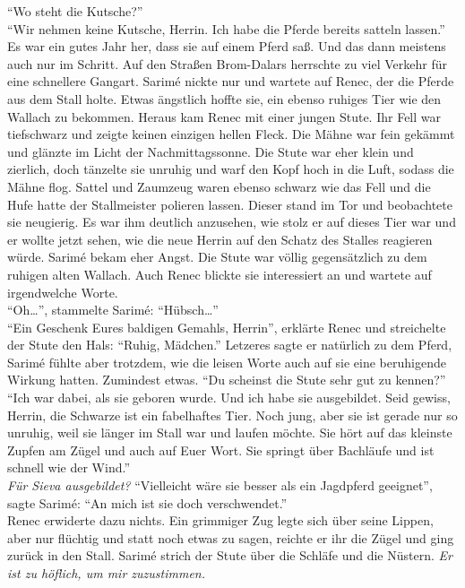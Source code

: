  ``Wo steht die Kutsche?''\\
``Wir nehmen keine Kutsche, Herrin. Ich habe die Pferde bereits satteln lassen.''\\
Es war ein gutes Jahr her, dass sie auf einem Pferd saß. Und das dann meistens auch nur im Schritt. 
Auf den Straßen Brom-Dalars herrschte zu viel Verkehr für eine schnellere Gangart. Sarimé nickte 
nur und wartete auf Renec, der die Pferde aus dem Stall holte. Etwas ängstlich hoffte sie, ein 
ebenso ruhiges Tier wie den Wallach zu bekommen. Heraus kam Renec mit einer jungen Stute. Ihr Fell 
war tiefschwarz und zeigte keinen einzigen hellen Fleck. Die Mähne war fein gekämmt und glänzte im 
Licht der Nachmittagssonne. Die Stute war eher klein und zierlich, doch tänzelte sie unruhig und 
warf den Kopf hoch in die Luft, sodass die Mähne flog. Sattel und Zaumzeug waren ebenso schwarz wie 
das Fell und die Hufe hatte der Stallmeister polieren lassen. Dieser stand im Tor und beobachtete 
sie neugierig. Es war ihm deutlich anzusehen, wie stolz er auf dieses Tier war und er wollte jetzt 
sehen, wie die neue Herrin auf den Schatz des Stalles reagieren würde. Sarimé bekam eher Angst. Die 
Stute war völlig gegensätzlich zu dem ruhigen alten Wallach. Auch Renec blickte sie interessiert an 
und wartete auf irgendwelche Worte.\\
``Oh…'', stammelte Sarimé: ``Hübsch…''\\
``Ein Geschenk Eures baldigen Gemahls, Herrin'', erklärte Renec und streichelte der Stute den Hals: 
``Ruhig, Mädchen.'' Letzeres sagte er natürlich zu dem Pferd, Sarimé fühlte aber trotzdem, wie die 
leisen Worte auch auf sie eine beruhigende Wirkung hatten. Zumindest etwas. ``Du scheinst die Stute 
sehr gut zu kennen?''\\
``Ich war dabei, als sie geboren wurde. Und ich habe sie ausgebildet. Seid gewiss, Herrin, die 
Schwarze ist ein fabelhaftes Tier. Noch jung, aber sie ist gerade nur so unruhig, weil sie länger 
im Stall war und laufen möchte. Sie hört auf das kleinste Zupfen am Zügel und auch auf Euer Wort. 
Sie springt über Bachläufe und ist schnell wie der Wind.''\\
\textit{Für Sieva ausgebildet?}
``Vielleicht wäre sie besser als ein Jagdpferd geeignet'', sagte Sarimé: ``An mich ist sie doch 
verschwendet.''\\
Renec erwiderte dazu nichts. Ein grimmiger Zug legte sich über seine Lippen, aber nur flüchtig und 
statt noch etwas zu sagen, reichte er ihr die Zügel und ging zurück in den Stall. Sarimé strich der 
Stute über die Schläfe und die Nüstern. \textit{Er ist zu höflich, um mir zuzustimmen.}\\
